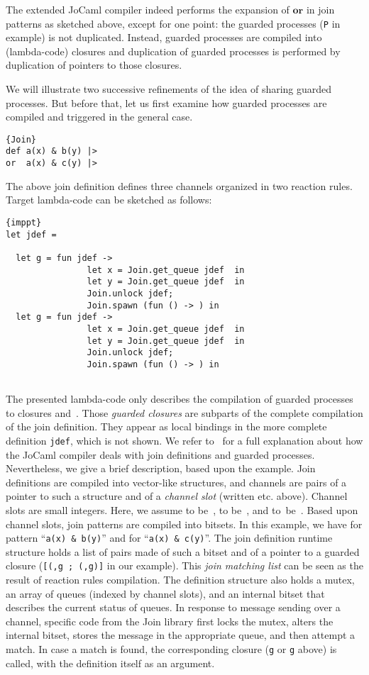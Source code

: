 \documentclass{LMCS}
\let \lst \lstinline
\newcommand{\jocaml}{\textrm{JoCaml}\xspace}
\newcommand{\kwd}[1]{\ensuremath{\mathbf{#1}}}
\renewcommand{\_}{\mathord{\rule[-.25ex]{1ex}{.15ex}}}
\begin{document}
The extended \jocaml compiler indeed performs the expansion
of \kwd{or} in join patterns as sketched above, except for one point:
the guarded processes (\lst|P| in example) is not duplicated.
Instead, guarded processes are compiled into (lambda-code) closures
and duplication of guarded processes is performed by duplication of
pointers to those closures.

We will illustrate two successive refinements of the idea of sharing
guarded processes.  But before that, let us first examine how guarded
processes are compiled and triggered in the general case.
\begin{lstlisting}{Join}
def a(x) & b(y) |> 
or  a(x) & c(y) |> 
\end{lstlisting}
The above join definition defines three channels organized in two
reaction rules. Target lambda-code can be sketched as follows:
\begin{lstlisting}[indent=1.8em,labelstep=1]{imppt}
let jdef =
    
  let g = fun jdef ->                   
                let x = Join.get_queue jdef  in 
                let y = Join.get_queue jdef  in 
                Join.unlock jdef;                        
                Join.spawn (fun () -> ) in  
  let g = fun jdef ->                   
                let x = Join.get_queue jdef  in 
                let y = Join.get_queue jdef  in 
                Join.unlock jdef;                         
                Join.spawn (fun () -> ) in 
   
\end{lstlisting}
The presented lambda-code only describes the compilation of guarded
processes to closures  and~.  Those
\emph{guarded closures} are subparts of the complete compilation of
the join definition. They appear as local bindings in the more
complete definition \lst|jdef|, which is not shown.  We refer
to~\cite{LeFessantMarangetCompileJoin} for a full explanation about
how the \jocaml compiler deals with join definitions and guarded
processes.  Nevertheless, we give a brief description, based upon the
example.  Join definitions are compiled into vector-like structures,
and channels are pairs of a pointer to such a structure and of a
\emph{channel slot} (written  etc. above).  Channel slots
are small integers.  Here, we assume  to be~,
 to be~, and  to~be~.  Based upon
channel slots, join patterns are compiled into bitsets. In this
example, we have  for pattern ``\lst!a(x) & b(y)!''  and 
for ``\lst!a(x) & c(y)!''.  The join definition runtime structure
holds a list of pairs made of such a bitset and of a pointer to a
guarded closure (\lst|[(,g ; (,g)]|
in our example).  This \emph{join matching list} can be seen as the
result of reaction rules compilation.  The definition structure also
holds a mutex, an array of queues (indexed by channel slots), and an
internal bitset that describes the current status of queues.  In
response to message sending over a channel, specific code from the
\textsf{Join} library first locks the mutex, alters the internal
bitset, stores the message in the appropriate queue, and then attempt a
match.  In case a match is found, the corresponding closure
(\lst|g| or \lst|g| above) is called, with the
definition itself as an argument.
\end{document}
